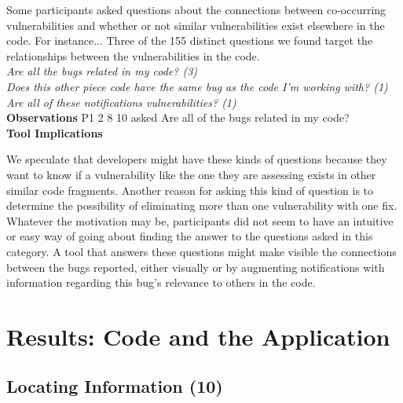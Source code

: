 \documentclass[conference]{IEEEtran}
\begin{document}
Some participants asked questions about the connections between co-occurring vulnerabilities and whether or not similar vulnerabilities exist elsewhere in the code. 
For instance...
Three of the 155 distinct questions we found target the relationships between the vulnerabilities in the code. 
\\

\noindent\emph{Are all the bugs related in my code? (3)} \\
\emph{Does this other piece code have the same bug as the code I'm working with? (1)} \\
\emph{Are all of these notifications vulnerabilities? (1)} \\


\noindent\textbf{Observations}
P1 2 8 10 asked
Are all of the bugs related in my code?
\\

\noindent\textbf{Tool Implications}

We speculate that developers might have these kinds of questions because they want to know if a vulnerability like the one they are assessing exists in other similar code fragments.
Another reason for asking this kind of question is to determine the possibility of eliminating more than one vulnerability with one fix. 
Whatever the motivation may be, participants did not seem to have an intuitive or easy way of going about finding the answer to the questions asked in this category.
A tool that answers these questions might make visible the connections between the bugs reported, either visually or by augmenting notifications with information regarding this bug's relevance to others in the code.



\section{Results: Code and the Application}
\label{sec:results-ca}





\noindent\subsection{\textbf{Locating Information (10)}}\label{li}
\end{document}
